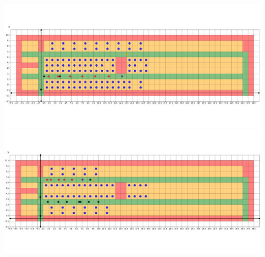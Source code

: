 \documentclass{article}
\begin{document}
\begin{center}
		\clearpage
		\thispagestyle{empty}
		\includegraphics[width=14cm]{twobtf2.jpg}\\
		\includegraphics[width=14cm]{twobtf3.jpg}\\
	\end{center}
\end{document}
